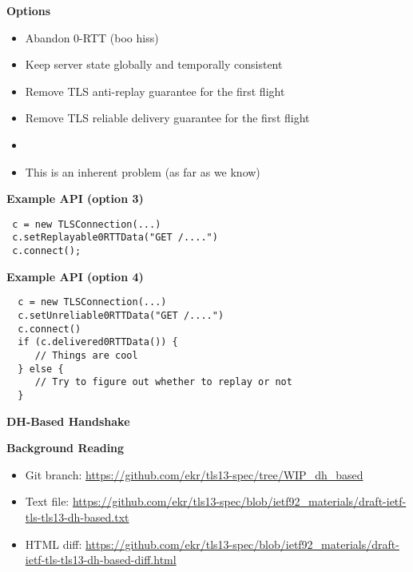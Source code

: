 \documentclass[helvetica]{seminar}
\newcommand{\heading}[1]{%
  \begin{center} 
    \large\bf 
    #1 
  \end{center} 
  \vspace{.4 in}}
\begin{document}
\begin{slide}
\heading{Options}

\begin{itemize}
\item Abandon 0-RTT (boo hiss)
\item Keep server state globally and temporally consistent
\item Remove TLS anti-replay guarantee for the first flight
\item Remove TLS reliable delivery guarantee for the first flight
\item[]
\item This is an inherent problem (as far as we know)
\end{itemize}

\end{slide}

\begin{slide}
\heading{Example API (option 3)}

\begin{verbatim}
 c = new TLSConnection(...)
 c.setReplayable0RTTData("GET /....")
 c.connect();
\end{verbatim}
\end{slide}


\begin{slide}
\heading{Example API (option 4)}

\begin{verbatim}
  c = new TLSConnection(...)
  c.setUnreliable0RTTData("GET /....")
  c.connect()
  if (c.delivered0RTTData()) {
     // Things are cool
  } else {
     // Try to figure out whether to replay or not
  }
\end{verbatim}
\end{slide}

\begin{slide}
\heading{DH-Based Handshake}
\end{slide}


\begin{slide}
\heading{Background Reading}

\begin{itemize}
\item Git branch: \url{https://github.com/ekr/tls13-spec/tree/WIP_dh_based}
\item Text file: \url{https://github.com/ekr/tls13-spec/blob/ietf92_materials/draft-ietf-tls-tls13-dh-based.txt}
\item HTML diff: \url{https://github.com/ekr/tls13-spec/blob/ietf92_materials/draft-ietf-tls-tls13-dh-based-diff.html}
\end{itemize}

\end{slide}
\end{document}
